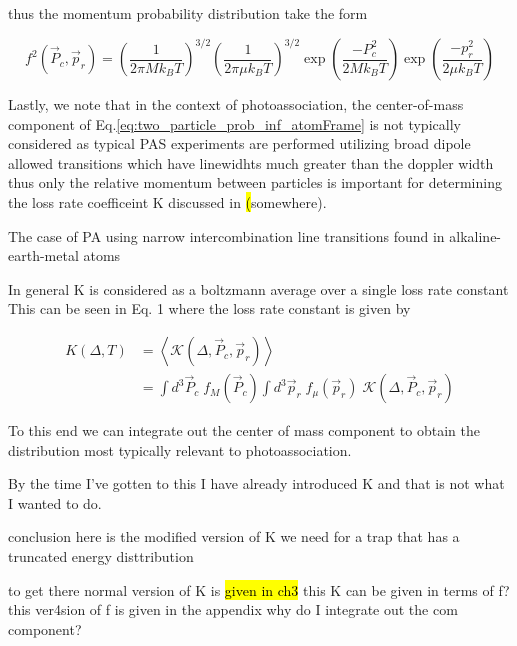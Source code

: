 thus the momentum probability distribution take the form

\begin{equation}
\label{eq:two_particle_prob_inf_atomFrame}
		 f^2( \vec{P}_c, \vec{p}_r ) = \left(\frac{1}{2 \pi M k_B T}\right)^{3/2} \left(\frac{1}{2 \pi \mu k_B T}\right)^{3/2} 
		 \exp\left(\frac{-P_c^2}{2 M k_B T}\right) \exp\left(\frac{-p_r^2}{2 \mu k_B T}\right)
\end{equation}

Lastly, we note that in the context of photoassociation, the center-of-mass component of Eq.\ref{eq:two_particle_prob_inf_atomFrame} is not typically considered as typical PAS experiments are performed utilizing broad dipole allowed transitions which have linewidhts much greater than the doppler width thus only the relative momentum between particles is important for determining the loss rate coefficeint K discussed in \hl(somewhere). 



The case of PA using narrow intercombination line transitions found in alkaline-earth-metal atoms 


In general K is considered as a boltzmann average over a single loss rate constant
This can be seen in \cite{Ciuryo2004} Eq. 1 where the loss rate constant is given by

\begin{equation}
\begin{split}
\label{eq:ciuryo04_eq1}
		 K(\Delta,T) &= \left\langle\mathcal{K}(\Delta,\vec{P}_c,\vec{p}_r)\right\rangle \\
		 &= \int d^3\vec{P}_c \; f_M(\vec{P}_c) \int d^3\vec{p}_r \; f_{\mu}(\vec{p}_r) \; \mathcal{K}(\Delta,\vec{P}_c,\vec{p}_r)
\end{split}
\end{equation}



To this end we can integrate out the center of mass component to obtain the distribution most typically relevant to photoassociation.

By the time I've gotten to this I have already introduced K and that is not what I wanted to do. 

conclusion
here is the modified version of K we need for a trap that has a truncated energy disttribution

to get there
normal version of K is \hl{given in ch3}
this K can be given in terms of f? 
this ver4sion of f is given in the appendix
	why do I integrate out the com component?




